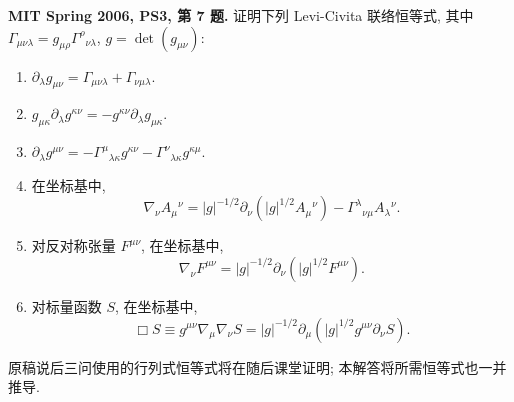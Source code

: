 \begin{exercise}
\textbf{MIT Spring 2006, PS3, 第 7 题.} 证明下列 Levi-Civita 联络恒等式, 其中 $\Gamma_{\mu\nu\lambda}=g_{\mu\rho}\Gamma^\rho{}_{\nu\lambda}$, $g=\det(g_{\mu\nu})$:
\begin{enumerate}[label=(\alph*)]
\item $\partial_\lambda g_{\mu\nu}=\Gamma_{\mu\nu\lambda}+\Gamma_{\nu\mu\lambda}$.
\item $g_{\mu\kappa}\partial_\lambda g^{\kappa\nu}=-g^{\kappa\nu}\partial_\lambda g_{\mu\kappa}$.
\item $\partial_\lambda g^{\mu\nu}=-\Gamma^\mu{}_{\lambda\kappa}g^{\kappa\nu}-\Gamma^\nu{}_{\lambda\kappa}g^{\kappa\mu}$.
\item 在坐标基中,
\[
 \nabla_\nu A_\mu{}^\nu=|g|^{-1/2}\partial_\nu(|g|^{1/2}A_\mu{}^\nu)
 -\Gamma^\lambda{}_{\nu\mu}A_\lambda{}^\nu.
\]
\item 对反对称张量 $F^{\mu\nu}$, 在坐标基中,
\[
 \nabla_\nu F^{\mu\nu}=|g|^{-1/2}\partial_\nu(|g|^{1/2}F^{\mu\nu}).
\]
\item 对标量函数 $S$, 在坐标基中,
\[
 \Box S\equiv g^{\mu\nu}\nabla_\mu\nabla_\nu S
 =|g|^{-1/2}\partial_\mu(|g|^{1/2}g^{\mu\nu}\partial_\nu S).
\]
\end{enumerate}
原稿说后三问使用的行列式恒等式将在随后课堂证明; 本解答将所需恒等式也一并推导.
\end{exercise}
